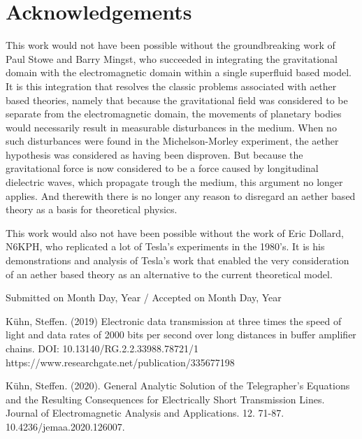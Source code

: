 \documentclass[twoside,final]{article}
\begin{document}
{\section*{Acknowledgements}

This work would not have been possible without the groundbreaking work of Paul
Stowe and Barry Mingst, who succeeded in integrating the gravitational domain
with the electromagnetic domain within a single superfluid based model. It is
this integration that resolves the classic problems associated with aether based
theories, namely that because the gravitational field was considered to be
separate from the electromagnetic domain, the movements of planetary bodies
would necessarily result in measurable disturbances in the medium. When no such
disturbances were found in the Michelson-Morley experiment, the aether
hypothesis was considered as having been disproven. But because the
gravitational force is now considered to be a force caused by longitudinal
dielectric waves, which propagate trough the medium, this argument no longer
applies. And therewith there is no longer any reason to disregard an aether
based theory as a basis for theoretical physics.

This work would also not have been possible without the work of Eric Dollard,
N6KPH, who replicated a lot of Tesla's experiments in the 1980's. It is his
demonstrations and analysis of Tesla's work that enabled the very consideration
of an aether based theory as an alternative to the current theoretical model.


%
\begin{flushright}\footnotesize
Submitted on Month Day, Year / Accepted on Month Day, Year
\end{flushright}


\begin{thebibliography}{99}\footnotesize


 K\"uhn, Steffen. (2019) Electronic data transmission at
three times the speed of light and data rates of 2000 bits per second over long
distances in buffer amplifier chains. DOI: 10.13140/RG.2.2.33988.78721/1
https://www.researchgate.net/publication/335677198

 K\"uhn, Steffen. (2020). General Analytic Solution of the
Telegrapher's Equations and the Resulting Consequences for Electrically Short
Transmission Lines. Journal of Electromagnetic Analysis and Applications. 12.
71-87. 10.4236/jemaa.2020.126007. 



\end{thebibliography}}
\end{document}
